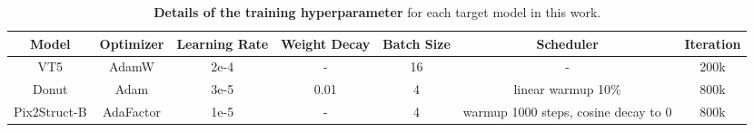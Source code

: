 \begin{table}[h]
\begin{center}
\begin{small}
\begin{adjustbox}{width=1\textwidth}
\small
\begin{tabular}{ccccccc}
\toprule
Model & Optimizer & Learning Rate & Weight Decay & Batch Size & Scheduler & Iteration \\
\midrule
VT5 & AdamW & 2e-4 & - & 16 & - & 200k\\
Donut & Adam & 3e-5 & 0.01 & 4 & linear warmup 10\% & 800k\\
Pix2Struct-B & AdaFactor & 1e-5 & - & 4 & warmup 1000 steps, cosine decay to 0 & 800k\\
\bottomrule
\end{tabular}
\end{adjustbox}
\end{small}
\end{center}
\caption{\textbf{Details of the training hyperparameter} for each target model in this work.}
\label{tab:training_params}
\vskip -0.1in
\end{table}
